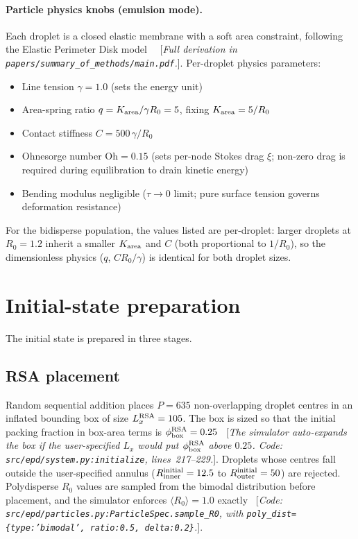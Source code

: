 \documentclass[aps,pre,twocolumn,floatfix,longbibliography]{revtex4-2}
\newcommand{\Rinner}{R_{\mathrm{inner}}}
\newcommand{\Router}{R_{\mathrm{outer}}}
\begin{document}
\paragraph*{Particle physics knobs (emulsion mode).}
Each droplet is a closed elastic membrane with a soft area constraint,
following the Elastic Perimeter Disk
model~\cite{epd_methods}~ [\textit{Full derivation in
\texttt{papers/summary\_of\_methods/main.pdf}.}].  Per-droplet physics
parameters:
\begin{itemize}
\item Line tension $\gamma = 1.0$ (sets the energy unit)
\item Area-spring ratio $q = K_{\rm area}/\gamma R_0 = 5$, fixing
      $K_{\rm area} = 5/R_0$
\item Contact stiffness $C = 500\, \gamma / R_0$
\item Ohnesorge number $\mathrm{Oh} = 0.15$ (sets per-node Stokes drag
      $\xi$; non-zero drag is required during equilibration to drain
      kinetic energy)
\item Bending modulus negligible ($\tau \to 0$ limit; pure surface
      tension governs deformation resistance)
\end{itemize}
For the bidisperse population, the values listed are per-droplet:
larger droplets at $R_0 = 1.2$ inherit a smaller $K_{\rm area}$ and
$C$ (both proportional to $1/R_0$), so the dimensionless physics
($q$, $C R_0/\gamma$) is identical for both droplet sizes.

\section{Initial-state preparation}
\label{sec:initialisation}

The initial state is prepared in three stages.

\subsection{RSA placement}
Random sequential addition places $P = 635$ non-overlapping droplet
centres in an inflated bounding box of size
$L_x^{\rm RSA} = 105$.  The box is sized so that the initial packing
fraction in box-area terms is $\phi^{\rm RSA}_{\rm box} =
0.25$~ [\textit{The simulator auto-expands the box if the user-specified
$L_x$ would put $\phi^{\rm RSA}_{\rm box}$ above $0.25$.  Code:
\texttt{src/epd/system.py:initialize}, lines~217--229.}].  Droplets
whose centres fall outside the user-specified annulus
($\Rinner^{\rm initial} = 12.5$ to $\Router^{\rm initial} = 50$) are
rejected.  Polydisperse $R_0$ values are sampled from the bimodal
distribution before placement, and the simulator enforces
$\langle R_0 \rangle = 1.0$ exactly~ [\textit{Code:
\texttt{src/epd/particles.py:ParticleSpec.sample\_R0}, with
\texttt{poly\_dist=\{type:'bimodal', ratio:0.5, delta:0.2\}}.}].
\end{document}
